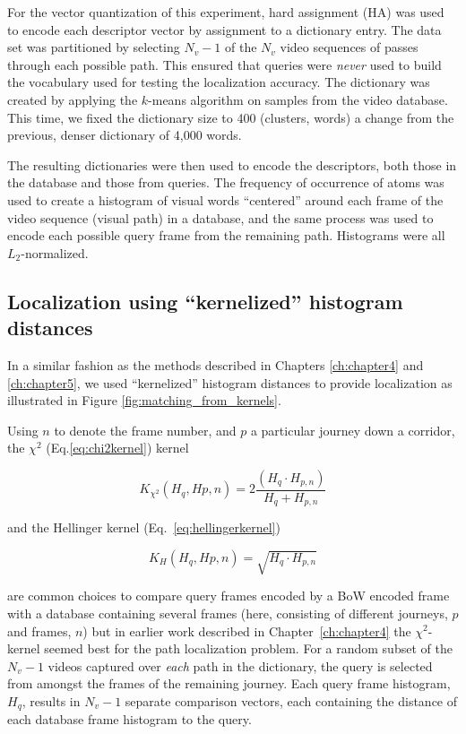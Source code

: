 For the vector quantization of this experiment, hard assignment (HA) was used to encode each descriptor vector by assignment to a dictionary entry. The data set was partitioned by selecting $N_v-1$ of the $N_v$ video sequences of passes through each possible path. This ensured that queries were {\em never} used to build the vocabulary used for testing the localization accuracy. The dictionary was created by applying the $k$-means algorithm on samples from the video database. This time, we fixed the dictionary size to 400 (clusters, words) a change from the previous, denser dictionary of 4,000 words.

The resulting dictionaries were then used to encode the descriptors, both those in the database and those from queries.  The frequency of occurrence of atoms was used to create a histogram of visual words ``centered'' around each frame of the video sequence (visual path) in a database, and the same process was used to encode each possible query frame from the remaining path. Histograms were all $L_2$-normalized.

\subsection{Localization using ``kernelized'' histogram distances}
\label{sec:methods}

In a similar fashion as the methods described in Chapters \ref{ch:chapter4} and \ref{ch:chapter5}, we used ``kernelized'' histogram distances  to provide localization as illustrated in Figure \ref{fig:matching_from_kernels}.

Using $n$ to denote the frame number, and $p$ a particular journey down a corridor, the 
$\chi^2$ (Eq.\ref{eq:chi2kernel}) kernel

\begin{equation}
K_{\chi^2}(H_q, H{p,n}) =  2 \frac{(H_q \cdot H_{p,n})}{H_q+H_{p,n}}
\label{eq:chi2kernel}
\end{equation}

and the Hellinger kernel (Eq.~\ref{eq:hellingerkernel})

\begin{equation}
K_{H}(H_q, H{p,n}) =  \sqrt{H_q \cdot H_{p,n}}
\label{eq:hellingerkernel}
\end{equation}

are common choices to compare query frames encoded by a BoW encoded frame with a database containing several frames (here, consisting of different journeys, $p$ and frames, $n$) but in earlier work described in Chapter~\ref{ch:chapter4} the $\chi^2$-kernel seemed best for the path localization problem.  For a random subset of the $N_v-1$ videos captured over {\em each} path in the dictionary, the query is selected from amongst the frames of the remaining journey.   Each query frame histogram, $H_q$, results in $N_v-1$ separate comparison vectors, each containing the distance of each database frame histogram to the query. 


